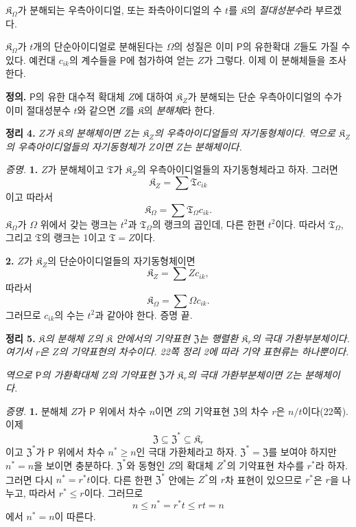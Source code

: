\(\mathfrak K_\Omega\)가 분해되는 우측아이디얼, 또는 좌측아이디얼의 수 \(t\)를 \(\mathfrak K\)의 \emph{절대성분수}라 부르겠다.

\(\mathfrak K_\Omega\)가 \(t\)개의 단순아이디얼로 분해된다는 \(\Omega\)의 성질은 이미 \(\mathsf P\)의 유한확대 \(Z\)들도 가질 수 있다. 예컨대 \(c_{ik}\)의 계수들을 \(\mathsf P\)에 첨가하여 얻는 \(Z\)가 그렇다. 이제 이 분해체들을 조사한다.

\textbf{정의.} \(\mathsf P\)의 유한 대수적 확대체 \(Z\)에 대하여 \(\mathfrak K_Z\)가 분해되는 단순 우측아이디얼의 수가 이미 절대성분수 \(t\)와 같으면 \(Z\)를 \(\mathfrak K\)의 \emph{분해체}라 한다.

\textbf{정리 4.} \emph{\(Z\)가 \(\mathfrak K\)의 분해체이면 \(Z\)는 \(\mathfrak K_Z\)의 우측아이디얼들의 자기동형체이다. 역으로 \(\mathfrak K_Z\)의 우측아이디얼들의 자기동형체가 \(Z\)이면 \(Z\)는 분해체이다.}

\emph{증명.} \textbf{1.} \(Z\)가 분해체이고 \(\mathfrak T\)가 \(\mathfrak K_Z\)의 우측아이디얼들의 자기동형체라고 하자. 그러면
\[
        \mathfrak K_Z=\sum\mathfrak T c_{ik}
\]
이고 따라서
\[
        \mathfrak K_\Omega
        =\sum\mathfrak T_\Omega c_{ik}.
\]
\(\mathfrak K_\Omega\)가 \(\Omega\) 위에서 갖는 랭크는 \(t^2\)과 \(\mathfrak T_\Omega\)의 랭크의 곱인데, 다른 한편 \(t^2\)이다. 따라서 \(\mathfrak T_\Omega\), 그리고 \(\mathfrak T\)의 랭크는 1이고 \(\mathfrak T=Z\)이다.

\textbf{2.} \(Z\)가 \(\mathfrak K_Z\)의 단순아이디얼들의 자기동형체이면
\[
        \mathfrak K_Z=\sum Zc_{ik},
\]
따라서
\[
        \mathfrak K_\Omega=\sum\Omega c_{ik}.
\]
그러므로 \(c_{ik}\)의 수는 \(t^2\)과 같아야 한다. 증명 끝.

\textbf{정리 5.} \emph{\(\mathfrak K\)의 분해체 \(Z\)의 \(\mathfrak K\) 안에서의 기약표현 \(\mathfrak Z\)는 행렬환 \(\mathfrak K_r\)의 극대 가환부분체이다. 여기서 \(r\)은 \(Z\)의 기약표현의 차수이다. 22쪽 정리 2에 따라 기약 표현류는 하나뿐이다.}

\emph{역으로 \(\mathsf P\)의 가환확대체 \(Z\)의 기약표현 \(\mathfrak Z\)가 \(\mathfrak K_r\)의 극대 가환부분체이면 \(Z\)는 분해체이다.}

\emph{증명.} \textbf{1.} 분해체 \(Z\)가 \(\mathsf P\) 위에서 차수 \(n\)이면 \(Z\)의 기약표현 \(\mathfrak Z\)의 차수 \(r\)은 \(n/t\)이다(22쪽). 이제
\[
        \mathfrak Z\subseteq\mathfrak Z^*
        \subseteq\mathfrak K_r
\]
이고 \(\mathfrak Z^*\)가 \(\mathsf P\) 위에서 차수 \(n^*\geq n\)인 극대 가환체라고 하자. \(\mathfrak Z^*=\mathfrak Z\)를 보여야 하지만 \(n^*=n\)을 보이면 충분하다. \(\mathfrak Z^*\)와 동형인 \(Z\)의 확대체 \(Z^*\)의 기약표현 차수를 \(r^*\)라 하자. 그러면 다시 \(n^*=r^*t\)이다. 다른 한편 \(\mathfrak Z^*\) 안에는 \(Z^*\)의 \(r\)차 표현이 있으므로 \(r^*\)은 \(r\)을 나누고, 따라서 \(r^*\leq r\)이다. 그러므로
\[
        n\leq n^*=r^*t\leq rt=n
\]
에서 \(n^*=n\)이 따른다.

